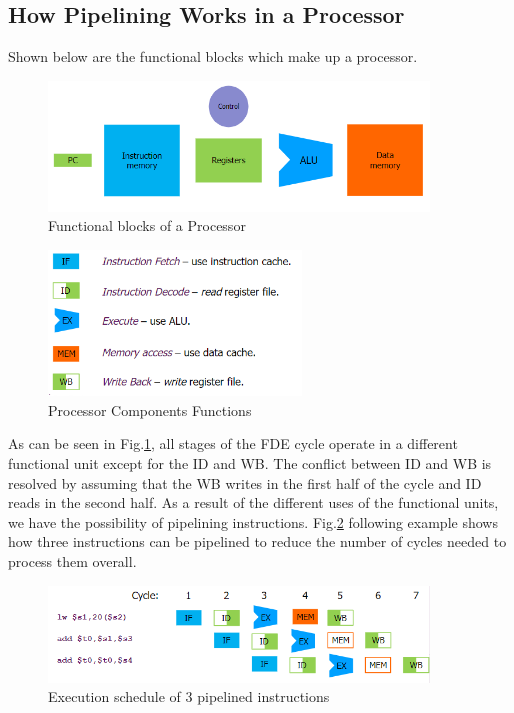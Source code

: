 \subsection{How Pipelining Works in a Processor}
Shown below are the functional blocks which make up a processor. 
\begin{figure}[H]
    \centering
    \includegraphics[width=0.9\textwidth]{assets/processor-components.png} 
    \caption{Functional blocks of a Processor}
\end{figure}
\begin{figure}[H]
    \centering
    \includegraphics[width=0.6\textwidth]{assets/processor-components-functions.png}
    \caption{Processor Components Functions} 
    \label{fig:processor-components-function}
\end{figure}

As can be seen in Fig.\ref{fig:processor-components-function}, all stages of the FDE cycle operate in a different functional unit except for the ID and WB. The conflict between ID and WB is resolved by assuming that the WB writes in the first half of the cycle and ID reads in the second half. As a result of the different uses of the functional units, we have the possibility of pipelining instructions. Fig.\ref{fig:pipelining-execution-schedule} following example shows how three instructions can be pipelined to reduce the number of cycles needed to process them overall.
\begin{figure}[H]
    \centering
    \includegraphics[width=0.9\textwidth]{assets/pipelining-execution-schedule.png}
    \caption{Execution schedule of 3 pipelined instructions}
    \label{fig:pipelining-execution-schedule}
\end{figure}


